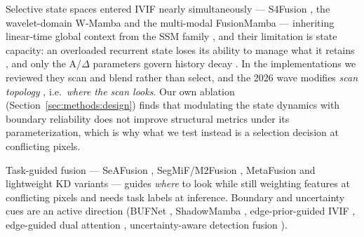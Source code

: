 \documentclass[pdflatex,sn-mathphys-num]{sn-jnl}
\theoremstyle{thmstyleone}%
\theoremstyle{thmstyletwo}%
\theoremstyle{thmstylethree}%
\begin{document}
Selective state spaces entered IVIF nearly simultaneously --- S4Fusion \cite{ma2025s4fusion}, the wavelet-domain W-Mamba \cite{zhang2025wmamba} and the multi-modal FusionMamba \cite{xie2024fusionmamba} --- inheriting linear-time global context from the SSM family \cite{gu2023mamba,dao2024transformers}, and their limitation is state capacity: an overloaded recurrent state loses its ability to manage what it retains \cite{chen2025stuffed}, and only the A/$\Delta$ parameters govern history decay \cite{ali2025hidden,lu2025mambamodulation}. In the implementations we reviewed they scan and blend rather than select, and the 2026 wave modifies \emph{scan topology} \cite{zhu2026interactive,cao2026shuffle,wang2026selfsupervised}, i.e.\ \emph{where the scan looks}. Our own ablation (Section~\ref{sec:methods:design}) finds that modulating the state dynamics with boundary reliability does not improve structural metrics under its parameterization, which is why what we test instead is a selection decision at conflicting pixels.

Task-guided fusion --- SeAFusion \cite{tang2022seafusion}, SegMiF/M2Fusion \cite{liu2023segmif}, MetaFusion \cite{zhao2023metafusion} and lightweight KD variants \cite{zhao2023lightweight,wang2025semantic} --- guides \emph{where} to look while still weighting features at conflicting pixels and needs task labels at inference. Boundary and uncertainty cues are an active direction (BUFNet \cite{zhou2026bufnet}, ShadowMamba \cite{zhu2026shadowmamba}, edge-prior-guided IVIF \cite{yuan2025segment}, edge-guided dual attention \cite{zou2023lightweight}, uncertainty-aware detection fusion \cite{zhao2024uncertainty}).
\end{document}
